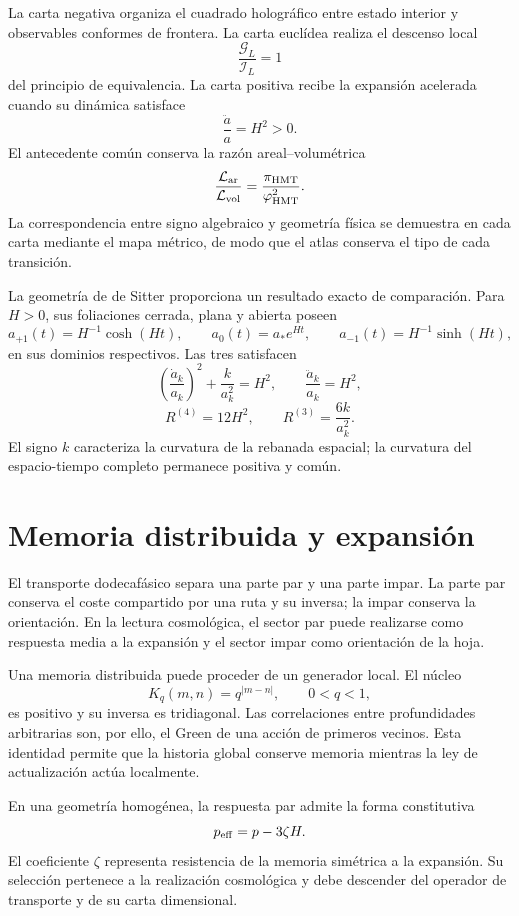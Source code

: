 La carta negativa organiza el cuadrado holográfico entre estado interior y
observables conformes de frontera. La carta euclídea realiza el descenso local
\[
 \frac{\mathcal G_L}{\mathcal I_L}=1
\]
del principio de equivalencia. La carta positiva recibe la expansión
acelerada cuando su dinámica satisface
\[
 \frac{\ddot a}{a}=H^2>0.
\]
El antecedente común conserva la razón areal--volumétrica
\[
 \frac{\mathcal L_{\rm ar}}{\mathcal L_{\rm vol}}
 =\frac{\pi_{\rm HMT}}{\varphi_{\rm HMT}^2}.
\]
La correspondencia entre signo algebraico y geometría física se demuestra en
cada carta mediante el mapa métrico, de modo que el atlas conserva el tipo de
cada transición.

La geometría de de Sitter proporciona un resultado exacto de comparación.
Para \(H>0\), sus foliaciones cerrada, plana y abierta poseen
\[
 a_{+1}(t)=H^{-1}\cosh(Ht),\qquad
 a_0(t)=a_*e^{Ht},\qquad
 a_{-1}(t)=H^{-1}\sinh(Ht),
\]
en sus dominios respectivos. Las tres satisfacen
\[
 \left(\frac{\dot a_k}{a_k}\right)^2+\frac{k}{a_k^2}=H^2,
 \qquad
 \frac{\ddot a_k}{a_k}=H^2,
\]
\[
 R^{(4)}=12H^2,\qquad
 R^{(3)}=\frac{6k}{a_k^2}.
\]
El signo \(k\) caracteriza la curvatura de la rebanada espacial; la
curvatura del espacio-tiempo completo permanece positiva y común.

\section{Memoria distribuida y expansión}

El transporte dodecafásico separa una parte par y una parte impar. La parte
par conserva el coste compartido por una ruta y su inversa; la impar conserva
la orientación. En la lectura cosmológica, el sector par puede realizarse
como respuesta media a la expansión y el sector impar como orientación de la
hoja.

Una memoria distribuida puede proceder de un generador local. El núcleo
\[
 K_q(m,n)=q^{|m-n|},\qquad 0<q<1,
\]
es positivo y su inversa es tridiagonal. Las correlaciones entre profundidades
arbitrarias son, por ello, el Green de una acción de primeros vecinos. Esta
identidad permite que la historia global conserve memoria mientras la ley de
actualización actúa localmente.

En una geometría homogénea, la respuesta par admite la forma constitutiva
\[
 p_{\rm eff}=p-3\zeta H.
\]
El coeficiente \(\zeta\) representa resistencia de la memoria simétrica a la
expansión. Su selección pertenece a la realización cosmológica y debe
descender del operador de transporte y de su carta dimensional.

